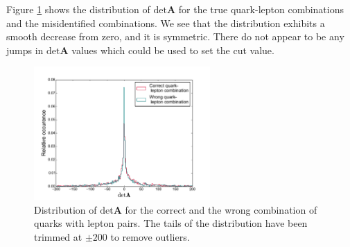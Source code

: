 \documentclass[twoside,english]{uiofysmaster}
\begin{document}
Figure \ref{fig:detA_distribution} shows the distribution of $\mathrm{det}\mathbf{A}$ for the true quark-lepton combinations and the misidentified combinations. We see that the distribution exhibits a smooth decrease from zero, and it is symmetric. There do not appear to be any jumps in $\mathrm{det}\mathbf{A}$ values which could be used to set the cut value.
\begin{figure}[hbt]
	\centering
		\includegraphics[width=0.6\textwidth]{figures/improving_combinatorics/detA_distribution_herwigpp.pdf} 
	\caption{Distribution of $\mathrm{det}\mathbf A$ for the correct and the wrong combination of quarks with lepton pairs. The tails of the distribution have been trimmed at $\pm 200$ to remove outliers.}
	\label{fig:detA_distribution}
\end{figure}
\end{document}
